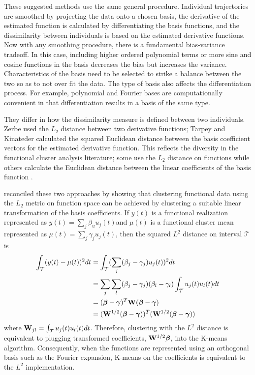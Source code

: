 These suggested methods use the same general procedure. Individual trajectories are smoothed by projecting the data onto a chosen basis, the derivative of the estimated function is calculated by differentiating the basis functions, and the dissimilarity between individuals is based on the estimated derivative functions. Now with any smoothing procedure, there is a fundamental bias-variance tradeoff. In this case, including higher ordered polynomial terms or more sine and cosine functions in the basis decreases the bias but increases the variance. Characteristics of the basis need to be selected to strike a balance between the two so as to not over fit the data. The type of basis also affects the differentiation process. For example, polynomial and Fourier bases are computationally convenient in that differentiation results in a basis of the same type.

They differ in how the dissimilarity measure is defined between two individuals. Zerbe used the $L_{2}$ distance between two derivative functions; Tarpey and Kinateder calculated the squared Euclidean distance between the basis coefficient vectors for the estimated derivative function. This reflects the diversity in the functional cluster analysis literature; some use the $L_{2}$ distance on functions \cite{hitchcock2007} while others calculate the Euclidean distance between the linear coefficients of the basis function \cite{serban2005, tarpey2003, abraham2003}.
 
\textcite{tarpey2007} reconciled these two approaches by showing that clustering functional data using the $L_{2}$ metric on function space can be achieved by clustering a suitable linear transformation of the basis coefficients. If $y(t)$ is a functional realization represented as $y(t)=\sum_{j}\beta_{u}u_{j}(t)$and $\mu(t)$ is a functional cluster mean represented as $\mu(t) = \sum_{j}\gamma_{j}u_{j}(t)$, then the squared $L^{2}$ distance on interval $\mathcal{T}$ is
\begin{align*}
\int_{\mathcal{T}}(y(t)-\mu(t))^{2}dt &= \int_{\mathcal{T}}(\sum_{j}(\beta_{j}-\gamma_{j})u_{j}(t))^{2}dt\\
&= \sum_{j}\sum_{l}(\beta_{j}-\gamma_{j})(\beta_{l}-\gamma_{l}) \int_{\mathcal{T}}u_{j}(t)u_{l}(t)dt\\
&=(\boldsymbol\beta-\boldsymbol\gamma)^{T}\mathbf W (\boldsymbol\beta-\boldsymbol\gamma)\\
&=(\mathbf W^{1/2}(\boldsymbol\beta-\boldsymbol\gamma))^{T} (\mathbf W^{1/2}(\boldsymbol\beta-\boldsymbol\gamma))
\end{align*}
where $\mathbf W_{jl} = \int_{\mathcal{T}}u_{j}(t)u_{l}(t)dt$. Therefore, clustering with the $L^{2}$ distance is equivalent to plugging transformed coefficients, $\mathbf W^{1/2}\boldsymbol\beta$, into the K-means algorithm. Consequently, when the functions are represented using an orthogonal basis such as the Fourier expansion, K-means on the coefficients is equivalent to the $L^{2}$ implementation.

